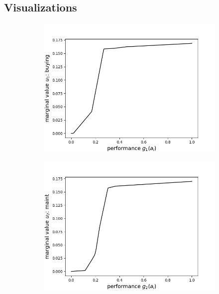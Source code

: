 \documentclass[../main.tex]{subfiles}
\begin{document}
\subsection{Visualizations}
\begin{figure}[H]
    \centering
    \begin{subfigure}[b]{0.48\linewidth}
        \includegraphics[width=\linewidth]{../img/marginal0.png}
    \end{subfigure}
    \begin{subfigure}[b]{0.48\linewidth}
        \includegraphics[width=\linewidth]{../img/marginal1.png}
    \end{subfigure}


\end{figure}
\end{document}
